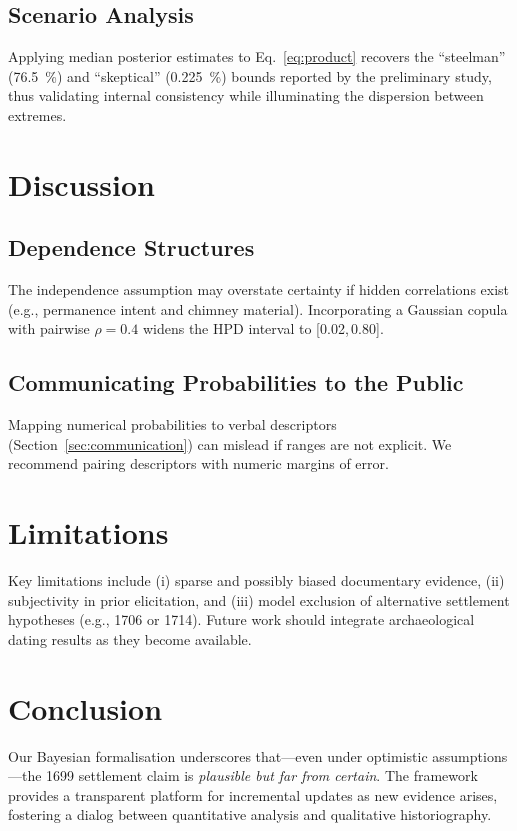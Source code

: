 \documentclass[11pt]{article}
\begin{document}
\subsection{Scenario Analysis}
Applying median posterior estimates to Eq.~\eqref{eq:product} recovers the ``steelman'' (\SI{76.5}{\percent}) and ``skeptical'' (\SI{0.225}{\percent}) bounds reported by the preliminary study, thus validating internal consistency while illuminating the dispersion between extremes.

\section{Discussion}
\subsection{Dependence Structures}
\label{subsec:dependencies}
The independence assumption may overstate certainty if hidden correlations exist (e.g., permanence intent and chimney material). Incorporating a Gaussian copula with pairwise $\rho=0.4$ widens the HPD interval to [\SI{0.02}{},\,\SI{0.80}{}].

\subsection{Communicating Probabilities to the Public}
Mapping numerical probabilities to verbal descriptors (Section~\ref{sec:communication}) can mislead if ranges are not explicit. We recommend pairing descriptors with numeric margins of error.

\section{Limitations}
Key limitations include (i) sparse and possibly biased documentary evidence, (ii) subjectivity in prior elicitation, and (iii) model exclusion of alternative settlement hypotheses (e.g., 1706 or 1714). Future work should integrate archaeological dating results as they become available.

\section{Conclusion}
Our Bayesian formalisation underscores that—even under optimistic assumptions—the 1699 settlement claim is \emph{plausible but far from certain}. The framework provides a transparent platform for incremental updates as new evidence arises, fostering a dialog between quantitative analysis and qualitative historiography.
\end{document}
